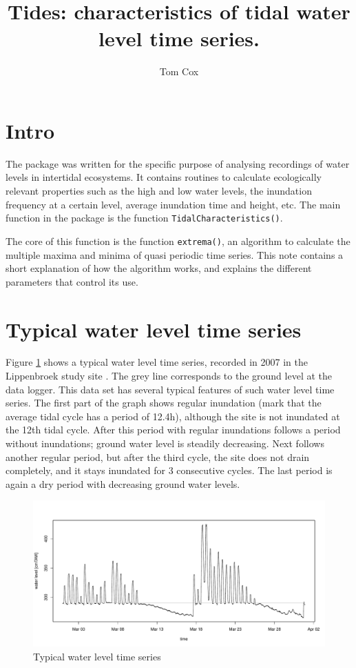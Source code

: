 \documentclass[10pt,a4wide]{article}
\author{Tom Cox}
\title{Tides: characteristics of tidal water level time series.}
\begin{document}


\maketitle
\section{Intro}
The package was written for the specific purpose of analysing recordings of water levels in intertidal ecosystems. It contains routines to calculate ecologically relevant properties such as the high and low water levels, the inundation frequency at a certain level, average inundation time and height, etc. The main function in the package is the function \texttt{TidalCharacteristics()}.

The core of this function is the function \texttt{extrema()}, an algorithm to calculate the multiple maxima and minima of quasi periodic time series. This note contains a short explanation of how the algorithm works, and explains the different parameters that control its use.

\section{Typical water level time series}
Figure \ref{Fig1} shows a typical water level time series, recorded in 2007 in the Lippenbroek study site \citep{Cox2006, Maris2007}. The grey line corresponds to the ground level at the data logger. This data set has several typical features of such water level time series. The first part of the graph shows regular inundation (mark that the average tidal cycle has a period of 12.4h), although the site is not inundated at the 12th tidal cycle. After this period with regular inundations follows a period without inundations; ground water level is steadily decreasing. Next follows another regular period, but after the third cycle, the site does not drain completely, and it stays inundated for 3 consecutive cycles. The last period is again a dry period with decreasing ground water levels.

\begin{figure}[h]
\begin{center}
\includegraphics{Tides-TideFig1}
\end{center}
\caption{Typical water level time series} 
\label{Fig1}
\end{figure}
\end{document}
